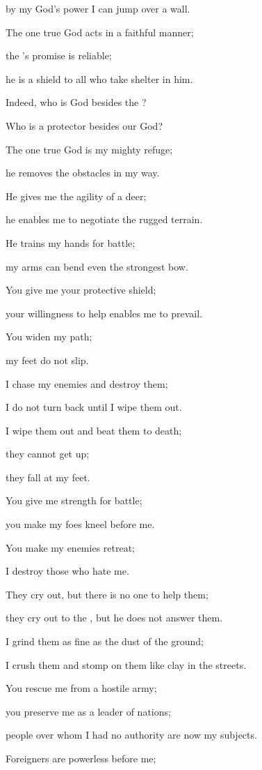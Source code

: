 {\par }{\Q by
my God’s power
I can jump over a
wall.
\par }{\Q {}The one true God
acts in a faithful manner;
\par }{\Q the
{}’s
promise
is reliable;
\par }{\Q he is
a shield
to all
who take shelter in him.
\par }{\Q {}Indeed,
who
is God
besides
the {}?
\par }{\Q Who
is a protector
besides
our God?
\par }{\Q {}The one true God
is my mighty refuge;
\par }{\Q he removes
the obstacles
in my way.
\par }{\Q {}He gives me the agility
of a deer;
\par }{\Q he enables me to negotiate
the rugged terrain.
\par }{\Q {}He trains
my hands
for battle;
\par }{\Q my arms can bend
even the strongest
bow.
\par }{\Q {}You give
me your protective
shield;
\par }{\Q your willingness
to help enables me
to prevail.
\par }{\Q {}You widen
my path;
\par }{\Q my feet
do not
slip.
\par }{\Q {}I chase
my enemies
and destroy
them;
\par }{\Q I do not
turn back
until
I wipe them out.
\par }{\Q {}I wipe
them out
and beat
them to death;
\par }{\Q they cannot
get up;
\par }{\Q they fall
at my feet.
\par }{\Q {}You give
me strength
for battle;
\par }{\Q you make my foes kneel
before me.
\par }{\Q {}You make
my enemies
retreat;
\par }{\Q I destroy
those who hate
me.
\par }{\Q {}They cry
out, but there is no
one to help
them;

\par }{\Q they cry out to
the {}, but he does not
answer them.
\par }{\Q {}I grind
them as fine as the dust
of the ground;
\par }{\Q I crush
them and stomp on
them like clay
in the streets.
\par }{\Q {}You rescue
me from a hostile
army;
\par }{\Q you preserve
me as a
leader
of nations;
\par }{\Q people
over whom I had no
authority are now my subjects.
\par }{\Q {}Foreigners
are powerless
before me;

}
